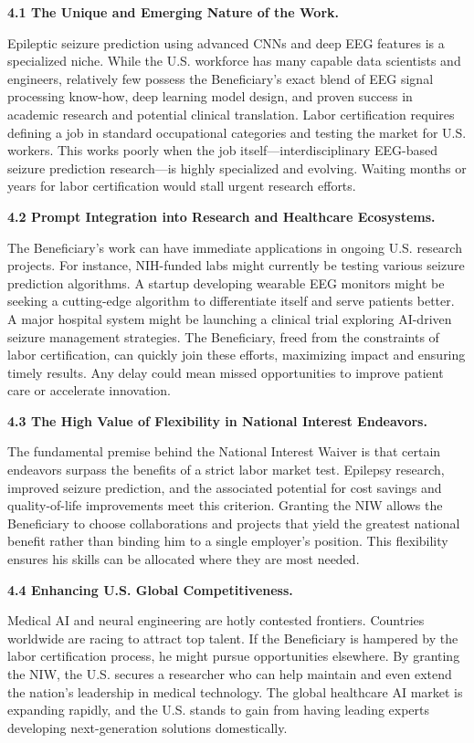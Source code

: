 \documentclass{article}
\begin{document}
{\bf 4.1 The Unique and Emerging Nature of the Work.}

Epileptic seizure prediction using advanced CNNs and deep EEG features is a specialized niche. While the U.S. workforce has many capable data scientists and engineers, relatively few possess the Beneficiary’s exact blend of EEG signal processing know-how, deep learning model design, and proven success in academic research and potential clinical translation. Labor certification requires defining a job in standard occupational categories and testing the market for U.S. workers. This works poorly when the job itself—interdisciplinary EEG-based seizure prediction research—is highly specialized and evolving. Waiting months or years for labor certification would stall urgent research efforts.

{\bf 4.2 Prompt Integration into Research and Healthcare Ecosystems.}

The Beneficiary’s work can have immediate applications in ongoing U.S. research projects. For instance, NIH-funded labs might currently be testing various seizure prediction algorithms. A startup developing wearable EEG monitors might be seeking a cutting-edge algorithm to differentiate itself and serve patients better. A major hospital system might be launching a clinical trial exploring AI-driven seizure management strategies. The Beneficiary, freed from the constraints of labor certification, can quickly join these efforts, maximizing impact and ensuring timely results. Any delay could mean missed opportunities to improve patient care or accelerate innovation.

{\bf 4.3 The High Value of Flexibility in National Interest Endeavors.}

The fundamental premise behind the National Interest Waiver is that certain endeavors surpass the benefits of a strict labor market test. Epilepsy research, improved seizure prediction, and the associated potential for cost savings and quality-of-life improvements meet this criterion. Granting the NIW allows the Beneficiary to choose collaborations and projects that yield the greatest national benefit rather than binding him to a single employer’s position. This flexibility ensures his skills can be allocated where they are most needed.


{\bf 4.4 Enhancing U.S. Global Competitiveness.}

Medical AI and neural engineering are hotly contested frontiers. Countries worldwide are racing to attract top talent. If the Beneficiary is hampered by the labor certification process, he might pursue opportunities elsewhere. By granting the NIW, the U.S. secures a researcher who can help maintain and even extend the nation’s leadership in medical technology. The global healthcare AI market is expanding rapidly, and the U.S. stands to gain from having leading experts developing next-generation solutions domestically.
\end{document}
